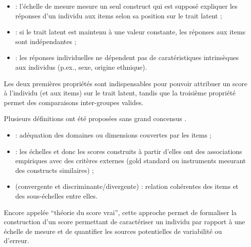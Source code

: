 
\begin{itemize}
\item {} : l'échelle de mesure mesure un seul
  construct qui est supposé expliquer les réponses d'un individu aux items selon
  sa position sur le trait latent ;
\item {} : si le trait latent est maintenu à une
  valeur constante, les réponses aux items sont indépendantes ;
\item {} : les réponses individuelles ne dépendent
  pas de caratéristiques intrinsèques aux individus (p.ex., sexe, origine ethnique).
\end{itemize}

Les deux premières propriétés sont indispensables pour pouvoir attribuer un
score à l'individu (et aux items) sur le trait latent, tandis que la troisième
propriété permet des comparaisons inter-groupes valides.



Plusieurs définitions ont été proposées sans grand concensus
\autocite{Falissard2008,Zumbo2007}.
\medskip

\begin{itemize}
\item {} : adéquation des domaines ou dimensions
  couvertes par les items ;
\item {} : les échelles et donc les scores
  construits à partir d'elles ont des associations empiriques avec des critères
  externes (gold standard ou instruments mesurant des constructs similaires) ;
\item {} (convergente et
  discriminante/divergente) : relation cohérentes des items et des
  sous-échelles entre elles.
\end{itemize}



Encore appelée \enquote{théorie du score vrai}, cette approche permet de
formaliser la construction d'un score permettant de caractériser un individu par
rapport à une échelle de mesure et de quantifier les sources potentielles de
variabilité ou d'erreur.

